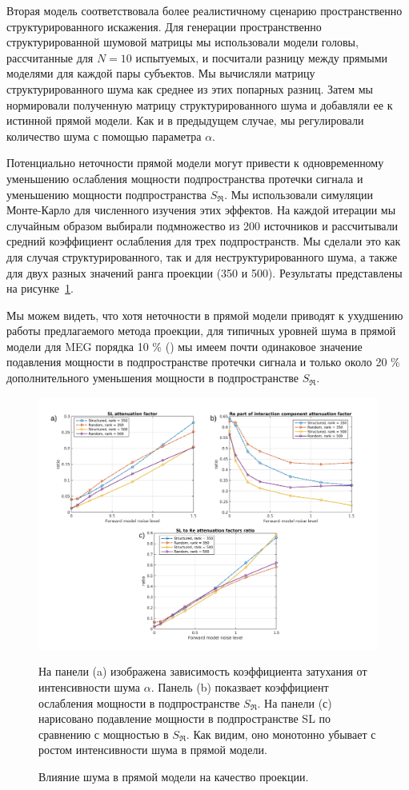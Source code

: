 Вторая модель соответствовала более реалистичному сценарию пространственно
структурированного искажения.  Для генерации пространственно структурированной
шумовой матрицы мы использовали модели головы, рассчитанные для $N=10$
испытуемых, и посчитали разницу между прямыми моделями для каждой пары
субъектов. Мы вычисляли матрицу структурированного шума как среднее из этих
попарных разниц. Затем мы нормировали полученную матрицу структурированного
шума и добавляли ее к истинной прямой модели. Как и в предыдущем случае, мы
регулировали количество шума с помощью параметра $\alpha$.

Потенциально неточности прямой модели могут привести к одновременному
уменьшению ослабления мощности подпространства протечки сигнала и уменьшению
мощности подпространства $S_{\Re}$.  Мы использовали симуляции Монте-Карло для
численного изучения этих эффектов.  На каждой итерации мы случайным образом
выбирали подмножество из 200 источников и рассчитывали средний коэффициент
ослабления для трех подпространств.  Мы сделали это как для случая
структурированного, так и для неструктурированного шума, а также для двух разных
значений ранга проекции (350 и 500). Результаты представлены на рисунке~\ref{fig:15}.

Мы можем видеть, что хотя неточности в прямой модели приводят к
ухудшению работы предлагаемого метода проекции, для типичных уровней
шума в прямой модели для MEG порядка 10 \% (\cite{Mosher1999}) мы имеем почти одинаковое значение
подавления мощности в подпространстве протечки сигнала и только около 20 \% дополнительного уменьшения мощности
в подпространстве $S_{\Re}$.

\begin{figure}[htbp]
\includegraphics[width=1\textwidth]{../images/psiicos_paper/Figure15_hr.jpg}
\caption{Влияние шума в прямой модели на качество проекции.}\label{fig:15} %
  На панели (a) изображена зависимость коэффициента затухания от интенсивности шума $\alpha$.
  Панель (b) показвает коэффициент ослабления мощности в подпространстве $S_{\Re}$.
  На панели (с) нарисовано подавление мощности в подпространстве SL по сравнению с мощностью в $S_{\Re}$.
  Как видим, оно монотонно убывает с ростом интенсивности шума в прямой модели.
 \end{figure}

